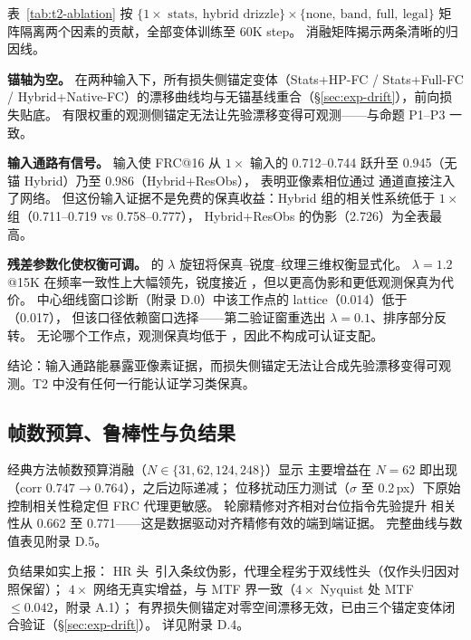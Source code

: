 表~\ref{tab:t2-ablation} 按 $\{1\times\text{ stats},\ \text{hybrid drizzle}\} \times \{\text{none},\ \text{band},\ \text{full},\ \text{legal}\}$ 矩阵隔离两个因素的贡献，全部变体训练至 60K step。
消融矩阵揭示两条清晰的归因线。

\textbf{锚轴为空。}
在两种输入下，所有损失侧锚定变体（Stats+HP-FC / Stats+Full-FC / Hybrid+Native-FC）的漂移曲线均与无锚基线重合（\S\ref{sec:exp-drift}），前向损失贴底。
有限权重的观测侧锚定无法让先验漂移变得可观测——与命题 P1--P3 一致。

\textbf{输入通路有信号。}
 输入使 FRC@16 从 $1\times$ 输入的 0.712--0.744 跃升至 0.945（无锚 Hybrid）乃至 0.986（Hybrid+ResObs），
表明亚像素相位通过  通道直接注入了网络。
但这份输入证据不是免费的保真收益：Hybrid 组的相关性系统低于 $1\times$ 组（0.711--0.719 vs 0.758--0.777），
Hybrid+ResObs 的伪影（2.726）为全表最高。

\textbf{残差参数化使权衡可调。}
 的 $\lambda$ 旋钮将保真--锐度--纹理三维权衡显式化。
$\lambda = 1.2$@15K 在频率一致性上大幅领先，锐度接近 ，但以更高伪影和更低观测保真为代价。
中心细线窗口诊断（附录 D.0）中该工作点的 lattice（0.014）低于 （0.017），
但该口径依赖窗口选择——第二验证窗重选出 $\lambda = 0.1$、排序部分反转。
无论哪个工作点，观测保真均低于 ，因此不构成可认证支配。

结论：输入通路能暴露亚像素证据，而损失侧锚定无法让合成先验漂移变得可观测。T2 中没有任何一行能认证学习类保真。

\subsection{帧数预算、鲁棒性与负结果}
\label{sec:exp-misc}

经典方法帧数预算消融（$N\in\{31,62,124,248\}$）显示  主要增益在 $N=62$ 即出现（corr $0.747\to0.764$），之后边际递减；
位移扰动压力测试（$\sigma$ 至 0.2\,px）下原始控制相关性稳定但 FRC 代理更敏感。
轮廓精修对齐相对台位指令先验提升  相关性从 0.662 至 0.771——这是数据驱动对齐精修有效的端到端证据。
完整曲线与数值表见附录 D.5。

负结果如实上报： HR 头~\cite{shi2016realtime}引入条纹伪影，代理全程劣于双线性头（仅作头归因对照保留）；
$4\times$ 网络无真实增益，与 MTF 界一致（$4\times$ Nyquist 处 MTF $\le 0.042$，附录 A.1）；
有界损失侧锚定对零空间漂移无效，已由三个锚定变体闭合验证（\S\ref{sec:exp-drift}）。
详见附录 D.4。
